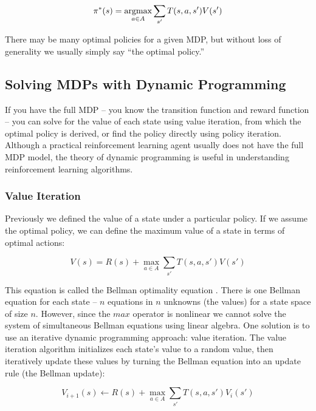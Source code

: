 \begin{equation}
\pi^*(s) = \operatorname*{argmax}_{a \in A} \sum_{s'} T(s, a, s') V(s')
\end{equation}

There may be many optimal policies for a given MDP, but without loss of generality we usually simply say ``the optimal policy.''

\subsection{Solving MDPs with Dynamic Programming}

If you have the full MDP -- you know the transition function and reward function -- you can solve for the value of each state using value iteration, from which the optimal policy is derived, or find the policy directly using policy iteration. Although a practical reinforcement learning agent usually does not have the full MDP model, the theory of dynamic programming is useful in understanding reinforcement learning algorithms.

\subsubsection{Value Iteration}

Previously we defined the value of a state under a particular policy. If we assume the optimal policy, we can define the maximum value of a state in terms of optimal actions:

\begin{equation}\label{eqn:bellman-equation}
V(s) = R(s) + \max_{a \in A} \sum_{s'} T(s, a, s') V(s')
\end{equation}

This equation is called the Bellman optimality equation \cite{bellman1957dynamic,bertsekas2012dynamic}. There is one Bellman equation for each state -- $n$ equations in $n$ unknowns (the values) for a state space of size $n$. However, since the $max$ operator is nonlinear we cannot solve the system of simultaneous Bellman equations using linear algebra. One solution is to use an iterative dynamic programming approach: value iteration. The value iteration algorithm initializes each state's value to a random value, then iteratively update these values by turning the Bellman equation into an update rule (the Bellman update):

\begin{equation}\label{eqn:bellman-update}
V_{i+1}(s) \leftarrow R(s) + \max_{a \in A} \sum_{s'} T(s, a, s') V_i(s')
\end{equation}

